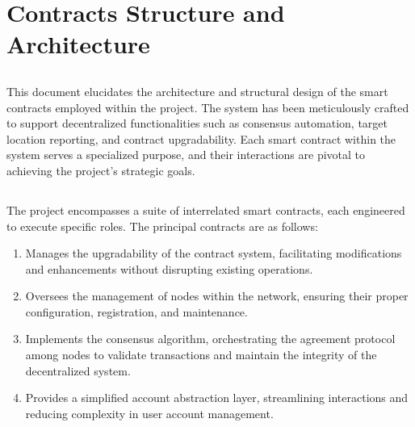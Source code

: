\documentclass[letterpaper,10pt,english]{sphinxmanual}
\let\sphinxpxdimen\pdfpxdimen\else\newdimen\sphinxpxdimen
\begin{document}
\section{Contracts Structure and Architecture}
\label{\detokenize{contracts_structure:contracts-structure-and-architecture}}

\subsection{}
\label{\detokenize{contracts_structure:introduction}}
\sphinxAtStartPar
This document elucidates the architecture and structural design of the smart contracts employed within the project. The system has been meticulously crafted to support decentralized functionalities such as consensus automation, target location reporting, and contract upgradability. Each smart contract within the system serves a specialized purpose, and their interactions are pivotal to achieving the project’s strategic goals.

\noindent{\hspace*{\fill}\sphinxincludegraphics[width=600\sphinxpxdimen]{{_static/network-architecture}.png}\hspace*{\fill}}


\subsection{}
\label{\detokenize{contracts_structure:contract-overview}}
\sphinxAtStartPar
The project encompasses a suite of interrelated smart contracts, each engineered to execute specific roles. The principal contracts are as follows:
\begin{enumerate}
%
\item {} 
\sphinxAtStartPar
{}
\sphinxhyphen{} Manages the upgradability of the contract system, facilitating modifications and enhancements without disrupting existing operations.

\item {} 
\sphinxAtStartPar
{}
\sphinxhyphen{} Oversees the management of nodes within the network, ensuring their proper configuration, registration, and maintenance.

\item {} 
\sphinxAtStartPar
{}
\sphinxhyphen{} Implements the consensus algorithm, orchestrating the agreement protocol among nodes to validate transactions and maintain the integrity of the decentralized system.

\item {} 
\sphinxAtStartPar
{}
\sphinxhyphen{} Provides a simplified account abstraction layer, streamlining interactions and reducing complexity in user account management.

\end{enumerate}
\end{document}
